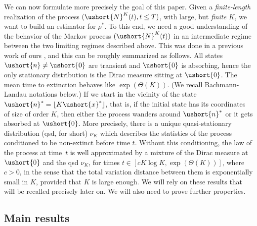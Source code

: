 \documentclass[11pt]{article}
\numberwithin{equation}{section}
\theoremstyle{plain}
\theoremstyle{definition}
\newcommand{\vecn}{\ushort{n}}
\newcommand{\vecnf}{\ushort{n}^*}
\newcommand{\vecxf}{\ushort{x}^*}
\newcommand{\veczer}{\ushort{0}}
\newcommand{\res}{\rho^*}
\newcommand{\leproc}{\ushort{N}^{K}}
\newcommand{\nuk}{\nu_{K}}\let\snuk\nuk
\begin{document}
We can now formulate more precisely the goal of this paper.
Given a \emph{finite-length} realization of the process $(\leproc(t), t\leq T)$, with large, but \emph{finite} $K$, we want to build an
estimator for $\res$.
To this end, we need a good understanding of the behavior of the Markov process $(\leproc(t))$ in an intermediate regime between the
two limiting regimes described above. This was done in a previous work of ours \cite{ccm2}, and this can be roughly summarized as follows.
All states $\vecn\neq \veczer$ are transient and $\veczer$ is absorbing, hence the only stationary distribution is the Dirac measure sitting at
$\veczer$. The mean time to extinction behaves like $\exp(\Theta(K))$. (We recall Bachmann-Landau notations below.)
If we start in the vicinity of the state $\vecnf = \lfloor K\vecxf\rfloor$, that is, if the initial state has its coordinates of size of order $K$,
then either the process wanders around $\vecnf$ or it gets absorbed at $\veczer$.
More precisely, there is a unique quasi-stationary distribution (qsd, for short) $\nuk$ which describes the statistics of the process conditioned
to be non-extinct before time $t$. Without this conditioning, the law of the process at time~$t$ is well approximated by a mixture of the
Dirac measure at $\veczer$ and the qsd $\nuk$, for times $t\in\left[c K\log K, \exp(\Theta(K))\right]$, where $c>0$, in the sense that the total variation
distance between them is exponentially small in $K$, provided that $K$ is large enough.
We will rely on these results that will be recalled precisely later on. We will also need to prove further properties.

\subsection{Main results}\label{subsec:main-results}
\end{document}
